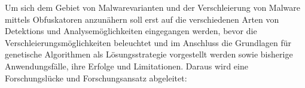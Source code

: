 Um sich dem Gebiet von Malwarevarianten und der Verschleierung von Malware mittels Obfuskatoren anzunähern soll erst auf die verschiedenen Arten von Detektions und Analysemöglichkeiten eingegangen werden, bevor die Verschleierungsmöglichkeiten beleuchtet und im Anschluss die Grundlagen für genetische Algorithmen als Lösungsstrategie vorgestellt werden sowie bisherige Anwendungsfälle, ihre Erfolge und Limitationen. Daraus wird eine Forschungslücke und Forschungsansatz abgeleitet: